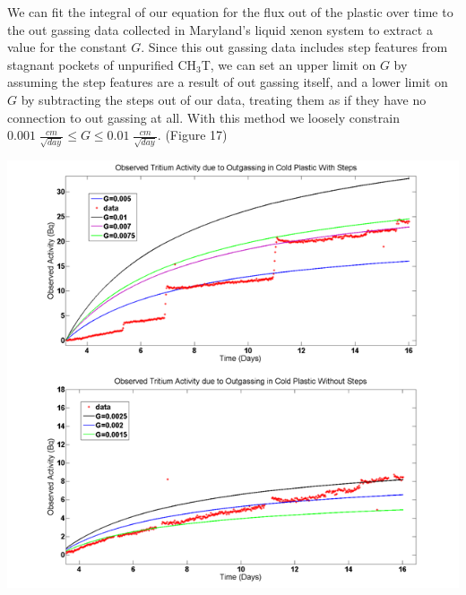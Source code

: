 \documentclass[a4paper,12pt]{article}
\begin{document}
We can fit the integral of our equation for the flux out of the plastic over time to the out gassing data collected in Maryland's liquid xenon system to extract a value for the constant $G$. Since this out gassing data includes step features from stagnant pockets of unpurified CH$_3$T, we can set an upper limit on $G$ by assuming the step features are a result of out gassing itself, and a lower limit on $G$ by subtracting the steps out of our data, treating them as if they have no connection to out gassing at all. With this method we loosely constrain $0.001 \; \frac{cm}{\sqrt{day}} \leq G \leq 0.01 \; \frac{cm}{\sqrt{day}}.$ (Figure 17)

\begin{center}
\includegraphics[scale=0.85]{StepsandNoSteps.png}
\end{center}
\end{document}
